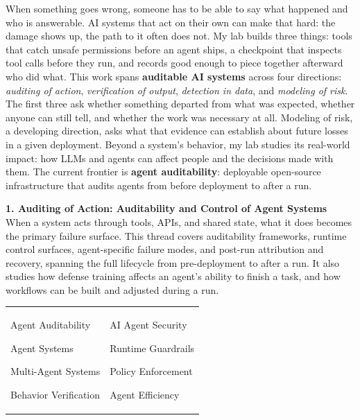 \documentclass[margin,line,pifont,palatino,courier]{res}
\newenvironment{list1}{
  \begin{list}{\ding{113}}{%
      \setlength{\itemsep}{0in}
      \setlength{\parsep}{0in} \setlength{\parskip}{0in}
      \setlength{\topsep}{0in} \setlength{\partopsep}{0in}
      \setlength{\leftmargin}{0.17in}}}{\end{list}}
\begin{document}
\begin{resume}
When something goes wrong, someone has to be able to say what happened and who is
answerable. AI systems that act on their own can make that hard: the damage shows
up, the path to it often does not. My lab builds three things: tools that catch
unsafe permissions before an agent ships, a checkpoint that inspects tool calls
before they run, and records good enough to piece together afterward who did what.
This work spans \textbf{auditable AI systems} across four directions:
\textit{auditing of action}, \textit{verification of output}, \textit{detection in
data}, and \textit{modeling of risk}. The first three ask whether something
departed from what was expected, whether anyone can still tell, and whether the
work was necessary at all. Modeling of risk, a developing direction, asks what
that evidence can establish about future losses in a given deployment. Beyond a system's behavior, my lab studies its real-world
impact: how LLMs and agents can affect people and the decisions made with them.
The current frontier is \textbf{agent auditability}:
deployable open-source infrastructure that audits agents from before deployment
to after a run.


{\color{uscred}\textbf{1. Auditing of Action: Auditability and Control of Agent Systems}}\\
When a system acts through tools, APIs, and shared state, what it does becomes the
primary failure surface. This thread covers auditability
frameworks, runtime control surfaces, agent-specific failure modes, and
post-run attribution and recovery, spanning the full lifecycle from
pre-deployment to after a run. It also studies how defense training
affects an agent's ability to finish a task, and how workflows can be built and
adjusted during a run.

\vspace{-0.15in}
\begin{tabular}{@{}p{}p{}}
\begin{list1}
\item Agent Auditability
\item Agent Systems
\item Multi-Agent Systems
\item Behavior Verification
\end{list1}
&
\begin{list1}
\item AI Agent Security
\item Runtime Guardrails
\item Policy Enforcement
\item Agent Efficiency
\end{list1}
\end{tabular}



\end{resume}
\end{document}
